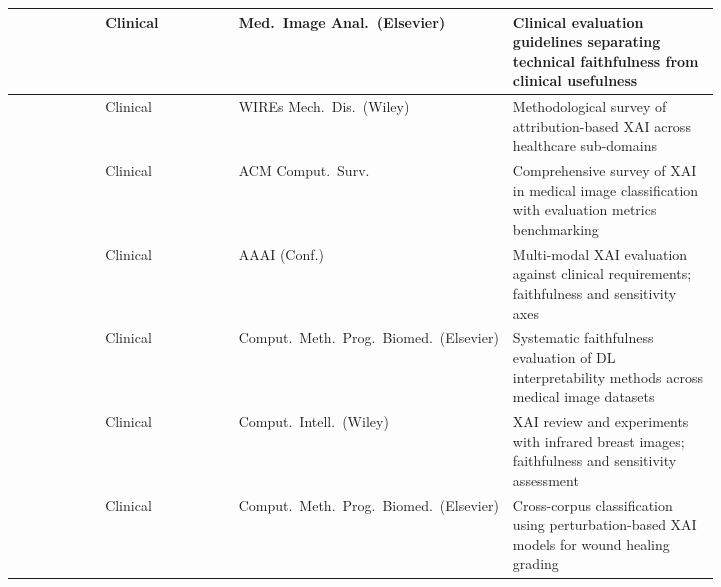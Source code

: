 \begin{longtable}{|>{\raggedright\arraybackslash}p{0.14\linewidth}|>{\raggedright\arraybackslash}p{0.20\linewidth}|>{\raggedright\arraybackslash}p{0.17\linewidth}|>{\raggedright\arraybackslash}p{0.31\linewidth}|}
\cite{jin2023guidelines} & Clinical & Med.\ Image Anal.\ (Elsevier) & Clinical evaluation guidelines separating technical faithfulness from clinical usefulness \\
\hline
\cite{jin2022explainable} & Clinical & WIREs Mech.\ Dis.\ (Wiley) & Methodological survey of attribution-based XAI across healthcare sub-domains \\
\hline
\cite{Patricio2023} & Clinical & ACM Comput.\ Surv. & Comprehensive survey of XAI in medical image classification with evaluation metrics benchmarking \\
\hline
\cite{jin2022evaluating} & Clinical & AAAI (Conf.) & Multi-modal XAI evaluation against clinical requirements; faithfulness and sensitivity axes \\
\hline
\cite{lamprou2024evaluation} & Clinical & Comput.\ Meth.\ Prog.\ Biomed.\ (Elsevier) & Systematic faithfulness evaluation of DL interpretability methods across medical image datasets \\
\hline
\cite{raghavan2024explainable} & Clinical & Comput.\ Intell.\ (Wiley) & XAI review and experiments with infrared breast images; faithfulness and sensitivity assessment \\
\hline
\cite{jacob2025indian} & Clinical & Comput.\ Meth.\ Prog.\ Biomed.\ (Elsevier) & Cross-corpus classification using perturbation-based XAI models for wound healing grading \\
\hline

\end{longtable}
